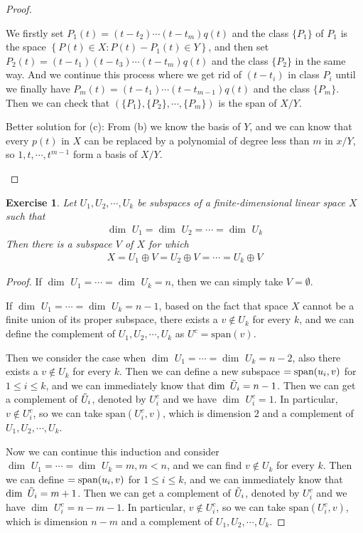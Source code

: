 \documentclass[11pt]{book}
\newtheorem{exercise}{Exercise}[section]
\theoremstyle{definition}
\numberwithin{equation}{chapter}
\begin{document}
\begin{proof}
\begin{enumerate}[label=(\alph*)]
    We firstly set $P_1(t) = (t-t_2)\cdots(t-t_m)q(t)$ and the class $\{P_1\}$ of $P_1$ is the space $\left\{P(t)\in X: P(t) - P_1(t) \in Y \right\}$, and then set $P_2(t) = (t-t_1)(t-t_3)\cdots(t-t_m)q(t)$ and the class $\{P_2 \}$ in the same way. And we continue this process where we get rid of $(t-t_i)$ in class $P_i$ until we finally have $P_m(t) = (t-t_1)\cdots(t-t_{m-1})q(t)$ and the class $\{P_m \}$. Then we can check that $( \{P_1\}, \{P_2\}, \cdots, \{P_m\})$ is the span of $X/Y$.
    
    Better solution for (c): From (b) we know the basis of $Y$, and we can know that every $p(t)$ in $X$ can be replaced by a polynomial of degree less than $m$ in $x/Y$, so $1, t, \cdots, t^{m-1}$ form a basis of $X/Y$.
\end{enumerate}
\end{proof}

\medskip

\begin{exercise}\label{ex_5}
Let $U_1,U_2,\cdots,U_k$ be subspaces of a finite-dimensional linear space $X$ such that
\begin{align*}
     \dim \,\,U_1 =  \dim \,\,U_2 = \cdots =  \dim \,\,U_k
\end{align*}
Then there is a subspace $V$ of $X$ for which
\begin{align*}
    X = U_1\oplus V = U_2\oplus V = \cdots = U_k\oplus V
\end{align*}
\end{exercise}
\begin{proof}
If $ \dim \,\, U_1 = \cdots =  \dim \,\, U_k = n$, then we can simply take $V = \emptyset$.

If $ \dim \,\, U_1 = \cdots =  \dim \,\, U_k = n-1$, based on the fact that space $X$ cannot be a finite union of its proper subspace, there exists a $v \notin U_k$ for every $k$, and we can define the complement of $U_1, U_2, \cdots, U_k$ as $U^c = \text{span}(v)$.

Then we consider the case when $ \dim \,\, U_1 = \cdots =  \dim \,\, U_k = n-2$, also there exists a $v \notin U_k$ for every $k$. Then we can define a new subspace $\title{\Tilde{U}_i} = \text{span}(u_i,v)$ for $1 \leq i \leq k$, and we can immediately know that $ \dim \,\, \Tilde{U}_i = n - 1$. Then we can get a complement of $\Tilde{U}_i$, denoted by $U_i^c$ and we have $ \dim \,\, U_i^c = 1$. In particular, $v \notin U_i^c$, so we can take $\text{span} (U_i^c, v)$, which is dimension $2$ and a complement of $U_1, U_2, \cdots, U_k$.

Now we can continue this induction and consider $ \dim \,\, U_1 = \cdots =  \dim \,\, U_k = m, m < n$, and we can find $v \notin U_k$ for every $k$. Then we can define $\title{\Tilde{U}_i} = \text{span}(u_i,v)$ for $1 \leq i \leq k$, and we can immediately know that $ \dim \,\, \Tilde{U}_i = m + 1$. Then we can get a complement of $\Tilde{U}_i$, denoted by $U_i^c$ and we have $ \dim \,\, U_i^c = n - m - 1$. In particular, $v \notin U_i^c$, so we can take $\text{span} (U_i^c, v)$, which is dimension $n - m$ and a complement of $U_1, U_2, \cdots, U_k$.
\end{proof}
\end{document}

